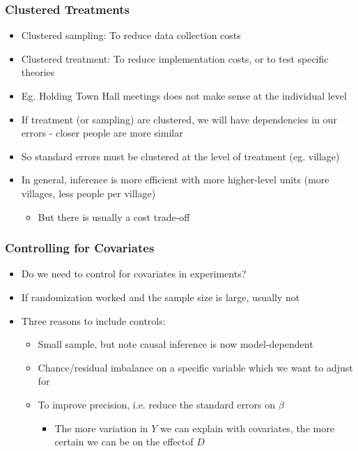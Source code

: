 \documentclass[xcolor=x11names,compress]{beamer}\usepackage[]{graphicx}\usepackage[]{color}
\renewcommand{\(}{\begin{columns}}
\renewcommand{\)}{\end{columns}}
\newcommand{\<}[1]{\begin{column}{#1}}
\renewcommand{\>}{\end{column}}
\begin{document}
\begin{frame}
\frametitle{Clustered Treatments}
\begin{itemize}
\item Clustered sampling: To reduce data collection costs
\pause
\item Clustered treatment: To reduce implementation costs, or to test specific theories
\pause
\item Eg. Holding Town Hall meetings does not make sense at the individual level
\pause
\item If treatment (or sampling) are clustered, we will have dependencies in our errors - closer people are more similar
\pause
\item So standard errors must be clustered at the level of treatment (eg. village)
\pause
\item In general, inference is more efficient with more higher-level units (more villages, less people per village)
\pause
\begin{itemize}
\item But there is usually a cost trade-off
\end{itemize}
\end{itemize}
\end{frame}

\begin{frame}
\frametitle{Controlling for Covariates}
\begin{itemize}
\item Do we need to control for covariates in experiments?
\pause
\item If randomization worked and the sample size is large, usually not
\pause
\item Three reasons to include controls:
\begin{itemize}
\item Small sample, but note causal inference is now model-dependent
\pause
\item Chance/residual imbalance on a specific variable which we want to adjust for
\pause
\item To improve precision, i.e. reduce the standard errors on $\beta$
\begin{itemize}
\item The more variation in $Y$ we can explain with covariates, the more certain we can be on the effectof $D$
\end{itemize}
\end{itemize}
\end{itemize}
\end{frame}
\end{document}
